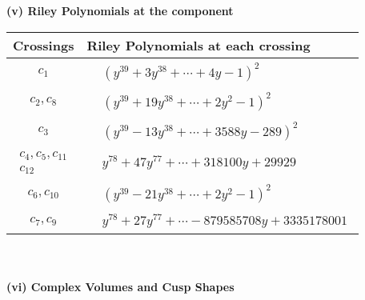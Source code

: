 \documentclass[1p]{elsarticle_modified}
\theoremstyle{definition}
\begin{document}
\newpage\renewcommand{\arraystretch}{1}
\flushleft \textbf{(v) Riley Polynomials at the component}\newline \\
\begin{tabular}{m{50pt}|m{274pt}}
Crossings & \hspace{64pt}Riley Polynomials at each crossing \\
\hline $$\begin{aligned}c_{1}\end{aligned}$$&$\begin{aligned}
&(y^{39}+3 y^{38}+\cdots+4 y-1)^{2}
\end{aligned}$\\
\hline $$\begin{aligned}c_{2},c_{8}\end{aligned}$$&$\begin{aligned}
&(y^{39}+19 y^{38}+\cdots+2 y^2-1)^{2}
\end{aligned}$\\
\hline $$\begin{aligned}c_{3}\end{aligned}$$&$\begin{aligned}
&(y^{39}-13 y^{38}+\cdots+3588 y-289)^{2}
\end{aligned}$\\
\hline $$\begin{aligned}c_{4},c_{5},c_{11}\\c_{12}\end{aligned}$$&$\begin{aligned}
&y^{78}+47 y^{77}+\cdots+318100 y+29929
\end{aligned}$\\
\hline $$\begin{aligned}c_{6},c_{10}\end{aligned}$$&$\begin{aligned}
&(y^{39}-21 y^{38}+\cdots+2 y^2-1)^{2}
\end{aligned}$\\
\hline $$\begin{aligned}c_{7},c_{9}\end{aligned}$$&$\begin{aligned}
&y^{78}+27 y^{77}+\cdots-879585708 y+3335178001
\end{aligned}$\\
\hline
\end{tabular}\\~\\
\newpage\flushleft \textbf{(vi) Complex Volumes and Cusp Shapes}
\end{document}
